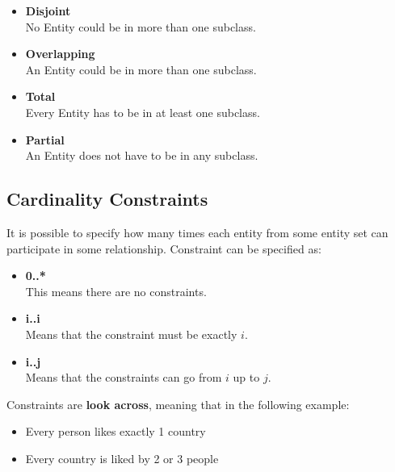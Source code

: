 \documentclass{article}
\begin{document}
\begin{itemize}
	\item \textbf{Disjoint}
	\vspace{.2cm} \\
	No Entity could be in more than one subclass.
	
	\item \textbf{Overlapping}
	\vspace{.2cm} \\
	An Entity could be in more than one subclass.
	
	\item \textbf{Total}
	\vspace{.2cm} \\
	Every Entity has to be in at least one subclass.
	
	\item \textbf{Partial}
	\vspace{.2cm} \\
	An Entity does not have to be in any subclass.
\end{itemize}

\subsection{Cardinality Constraints}
It is possible to specify how many times each entity from some entity set can participate in some relationship. Constraint can be specified as:

\begin{itemize}
	\item \textbf{0..*}
	\vspace{.2cm} \\
	This means there are no constraints.
	
	\item \textbf{i..i}
	\vspace{.2cm} \\
	Means that the constraint must be exactly $i$.
	
	\item \textbf{i..j}
	\vspace{.2cm} \\
	Means that the constraints can go from $i$ up to $j$.
\end{itemize}
Constraints are \textbf{look across}, meaning that in the following example:

\begin{itemize}
	\item Every person likes exactly 1 country
	\item Every country is liked by 2 or 3 people
\end{itemize}
\end{document}
